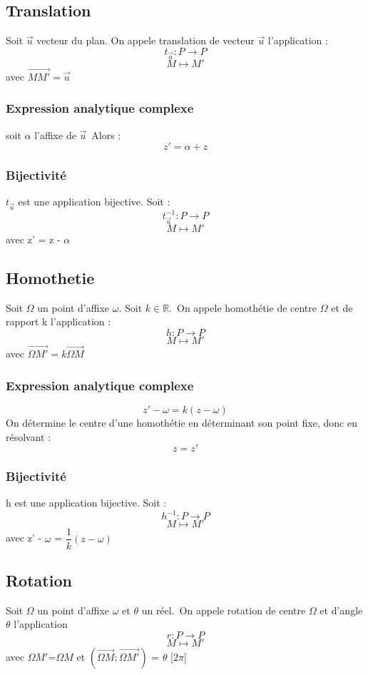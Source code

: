 \subsection{Translation}
\begin{de}
 Soit $\overrightarrow{u}$ vecteur du plan. On appele translation de vecteur $\overrightarrow{u}$ l'application :
$$t_{\overrightarrow{u}} : P \rightarrow P$$
$$M \mapsto M'$$
avec $\overrightarrow{MM'} = \overrightarrow{u}$
\end{de}
\subsubsection{Expression analytique complexe}
soit $\alpha$ l'affixe de $\overrightarrow{u}$\
Alors :
$$z' = \alpha + z$$
\subsubsection{Bijectivité}
$t_{\overrightarrow{u}}$ est une application bijective. Soit :
$$t_{\overrightarrow{u}}^{-1} : P \rightarrow P$$
$$M \mapsto M'$$
avec z' = z - $\alpha$
\subsection{Homothetie}
\begin{de}
 Soit $\Omega$ un point d'affixe $\omega$. Soit $k \in \mathbb{R}$.\
On appele homothétie de centre $\Omega$ et de rapport k l'application :
$$h :  P \rightarrow P $$
$$M \mapsto M'$$
avec $\overrightarrow{\Omega M'}=k\overrightarrow{\Omega M}$ 
\end{de}
\subsubsection{Expression analytique complexe}
$$z'-\omega = k(z-\omega)$$
On détermine le centre d'une homothétie en déterminant son point fixe, donc en résolvant :
$$z = z'$$
\subsubsection{Bijectivité}
h est une application bijective. Soit :
$$h^{-1} : P \rightarrow P$$
$$M \mapsto M'$$
avec z' - $\omega$ = $\dfrac{1}{k}(z - \omega)$
\subsection{Rotation}
\begin{de}
Soit $\Omega$ un point d'affixe $\omega$ et $\theta$ un réel.\
On appele rotation de centre $\Omega$ et d'angle $\theta$ l'application
$$r : P \rightarrow P$$
$$M \mapsto M'$$
avec $\Omega M'$=$\Omega M$ et $(\overrightarrow{\Omega M};\overrightarrow{\Omega M'})$ = $\theta$ [$2\pi$]
\end{de}
